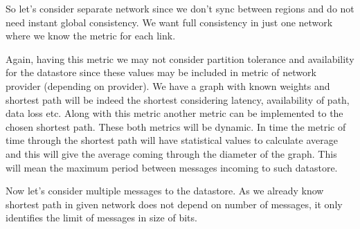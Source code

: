 \documentclass{llncs}
\begin{document}
So let's consider separate network since we don't sync between regions and do not need instant global consistency. We want full consistency in just one network where we know the metric for each link.

Again, having this metric we may not consider partition tolerance and availability for the datastore since these values may be included in metric of network provider (depending on provider). We have a graph with known weights and shortest path will be indeed the shortest considering latency, availability of path, data loss etc. Along with this metric another metric can be implemented to the chosen shortest path. These both metrics will be dynamic.
In time the metric of time through the shortest path will have statistical values to calculate average and this will give the average coming through the diameter of the graph. 
This will mean the maximum period between messages incoming to such datastore.

Now let's consider multiple messages to the datastore. As we already know shortest path in given network does not depend on number of messages, it only identifies the limit of messages
in size of bits.
 
\end{document}
